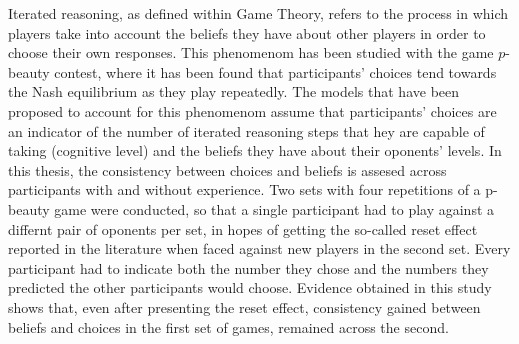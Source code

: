 \documentclass[
12pt, %
spanish, %
onehalfspacing, %
headsepline, %
]{MastersDoctoralThesis} %
\begin{document}
Iterated reasoning, as defined within Game Theory, refers to the process in which players take into account the beliefs they have about other players in order to choose their own responses. This phenomenom has been studied with the game $p$-beauty contest, where it has been found that participants' choices tend towards the Nash equilibrium as they play repeatedly. The models that have been proposed to account for this phenomenom assume that participants' choices are an indicator of the number of iterated reasoning steps that hey are capable of taking (cognitive level) and the beliefs they have about their oponents' levels. In this thesis, the consistency between choices and beliefs is assesed across participants with and without experience. Two sets with four repetitions of a p-beauty game were conducted, so that a single participant had to play against a differnt pair of oponents per set, in hopes of getting the so-called reset effect reported in the literature when faced against new players in the second set. Every participant had to indicate both the number they chose and the numbers they predicted the other participants would choose. Evidence obtained in this study shows that, even after presenting the reset effect, consistency gained between beliefs and choices in the first set of games, remained across the second.\\


\end{document}

